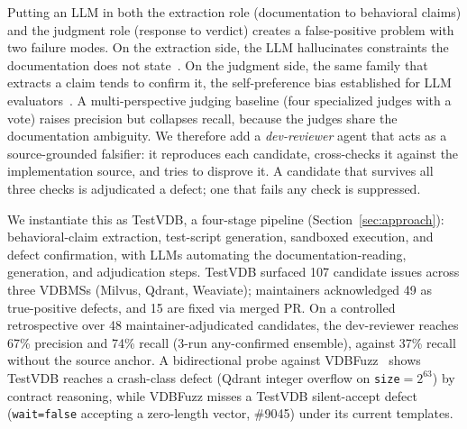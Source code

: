 \documentclass[sigconf]{acmart}
\begin{document}
Putting an LLM in both the extraction role (documentation to behavioral claims) and the judgment role (response to verdict) creates a false-positive problem with two failure modes. On the extraction side, the LLM hallucinates constraints the documentation does not state~\cite{ji23hall}. On the judgment side, the same family that extracts a claim tends to confirm it, the self-preference bias established for LLM evaluators~\cite{panickssery24}. A multi-perspective judging baseline (four specialized judges with a vote) raises precision but collapses recall, because the judges share the documentation ambiguity. We therefore add a \emph{dev-reviewer} agent that acts as a source-grounded falsifier: it reproduces each candidate, cross-checks it against the implementation source, and tries to disprove it. A candidate that survives all three checks is adjudicated a defect; one that fails any check is suppressed.

We instantiate this as TestVDB, a four-stage pipeline (Section~\ref{sec:approach}): behavioral-claim extraction, test-script generation, sandboxed execution, and defect confirmation, with LLMs automating the documentation-reading, generation, and adjudication steps. TestVDB surfaced 107 candidate issues across three VDBMSs (Milvus, Qdrant, Weaviate); maintainers acknowledged 49 as true-positive defects, and 15 are fixed via merged PR. On a controlled retrospective over 48 maintainer-adjudicated candidates, the dev-reviewer reaches 67\% precision and 74\% recall (3-run any-confirmed ensemble), against 37\% recall without the source anchor. A bidirectional probe against VDBFuzz~\cite{vdbfuzz26} shows TestVDB reaches a crash-class defect (Qdrant integer overflow on \texttt{size}$=2^{63}$) by contract reasoning, while VDBFuzz misses a TestVDB silent-accept defect (\texttt{wait=false} accepting a zero-length vector, \#9045) under its current templates.
\end{document}
